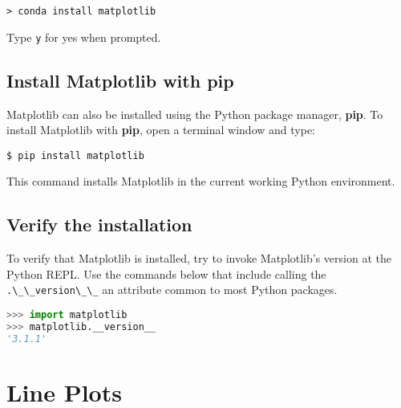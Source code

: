\documentclass{book}
\newcommand{\passthrough}[1]{#1}
\begin{document}
\begin{lstlisting}
> conda install matplotlib
\end{lstlisting}

Type \passthrough{\lstinline!y!} for yes when prompted.
    




    
        \hypertarget{install-matplotlib-with-pip}{%
\subsection{\texorpdfstring{Install Matplotlib with
\textbf{pip}}{Install Matplotlib with pip}}\label{install-matplotlib-with-pip}}

Matplotlib can also be installed using the Python package manager,
\textbf{pip}. To install Matplotlib with \textbf{pip}, open a terminal
window and type:

\begin{lstlisting}
$ pip install matplotlib
\end{lstlisting}

This command installs Matplotlib in the current working Python
environment.
    




    
        \hypertarget{verify-the-installation}{%
\subsection{Verify the installation}\label{verify-the-installation}}
    




    
        To verify that Matplotlib is installed, try to invoke Matplotlib's
version at the Python REPL. Use the commands below that include calling
the \passthrough{\lstinline!.\_\_version\_\_!} an attribute common to
most Python packages.
    




    
        \begin{lstlisting}[language=Python]
>>> import matplotlib
>>> matplotlib.__version__
'3.1.1'
\end{lstlisting}
    




    
        \hypertarget{line-plots}{%
\section{Line Plots}\label{line-plots}}
    
\end{document}
